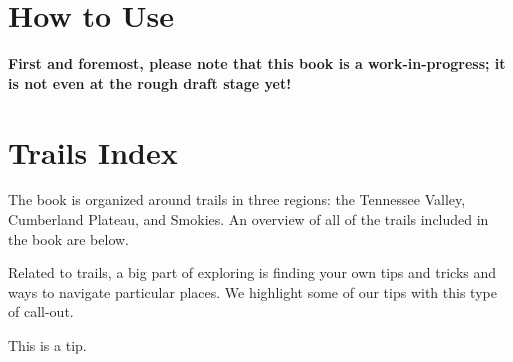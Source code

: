 \documentclass[
]{book}
\begin{document}
\hypertarget{how-to-use}{%
\section*{How to Use}\label{how-to-use}}

\textbf{First and foremost, please note that this book is a work-in-progress; it is not even at the rough draft stage yet!}

\hypertarget{trails-index}{%
\section*{Trails Index}\label{trails-index}}

The book is organized around trails in three regions: the Tennessee Valley, Cumberland Plateau, and Smokies. An overview of all of the trails included in the book are below.

Related to trails, a big part of exploring is finding your own tips and tricks and ways to navigate particular places. We highlight some of our tips with this type of call-out.

\begin{rmdtip}
This is a tip.
\end{rmdtip}
\end{document}
